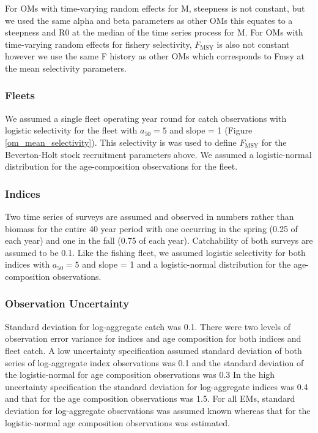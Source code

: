 \documentclass[
  12pt,
]{article}
\newcommand{\Fmsy}{\ensuremath{F_{\text{MSY}}}\xspace}
\begin{document}
For OMs with time-varying random effects for M, steepness is not
constant, but we used the same alpha and beta parameters as other OMs
this equates to a steepness and R0 at the median of the time series
process for M. For OMs with time-varying random effects for fishery
selectivity, \Fmsy is also not constant however we use the same F
history as other OMs which corresponds to Fmsy at the mean selectivity
parameters.

\hypertarget{fleets}{%
\subsubsection*{Fleets}\label{fleets}}

We assumed a single fleet operating year round for catch observations
with logistic selectivity for the fleet with \(a_{50} = 5\) and slope =
1 (Figure \ref{om_mean_selectivity}). This selectivity is was used to
define \Fmsy for the Beverton-Holt stock recruitment parameters above.
We assumed a logistic-normal distribution for the age-composition
observations for the fleet.

\hypertarget{indices}{%
\subsubsection*{Indices}\label{indices}}

Two time series of surveys are assumed and observed in numbers rather
than biomass for the entire 40 year period with one occurring in the
spring (0.25 of each year) and one in the fall (0.75 of each year).
Catchability of both surveys are assumed to be 0.1. Like the fishing
fleet, we assumed logistic selectivity for both indices with
\(a_{50} = 5\) and slope = 1 and a logistic-normal distribution for the
age-composition observations.

\hypertarget{observation-uncertainty}{%
\subsubsection*{Observation Uncertainty}\label{observation-uncertainty}}

Standard deviation for log-aggregate catch was 0.1. There were two
levels of observation error variance for indices and age composition for
both indices and fleet catch. A low uncertainty specification assumed
standard deviation of both series of log-aggregate index observations
was 0.1 and the standard deviation of the logistic-normal for age
composition observations was 0.3 In the high uncertainty specification
the standard deviation for log-aggregate indices was 0.4 and that for
the age composition observations was 1.5. For all EMs, standard
deviation for log-aggregate observations was assumed known whereas that
for the logistic-normal age composition observations was estimated.
\end{document}
